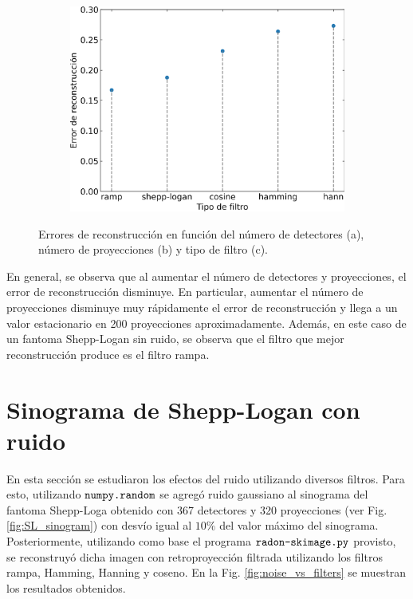\documentclass[letterpaper,12pt]{article}
\theoremstyle{plain}
\begin{document}
\begin{figure}[H]
\begin{subfigure}[h]{0.32\linewidth}
           \caption{}
           \label{fig:err_proy}
        \end{subfigure}
        \begin{subfigure}[h]{0.32\linewidth}
         \centering
         \includegraphics[width=\textwidth]{Figuras/error_vs_filters.png}
         \caption{}
         \label{fig:err_filtro}
      \end{subfigure}
   \caption{Errores de reconstrucción en función del número de detectores (a), número de proyecciones (b) y tipo de filtro (c).}
   \label{fig:err_vs_param}
\end{figure}

En general, se observa que al aumentar el número de detectores y proyecciones, el error de reconstrucción disminuye. En particular, aumentar el número de proyecciones disminuye muy rápidamente el error de reconstrucción y llega a un valor estacionario en 200 proyecciones aproximadamente. Además, en este caso de un fantoma Shepp-Logan sin ruido, se observa que el filtro que mejor reconstrucción produce es el filtro rampa. 

\section{Sinograma de Shepp-Logan con ruido}

En esta sección se estudiaron los efectos del ruido utilizando diversos filtros. Para esto, utilizando $\verb|numpy.random|$ se agregó ruido gaussiano al sinograma del fantoma Shepp-Loga obtenido con 367 detectores y 320 proyecciones (ver Fig. \ref{fig:SL_sinogram}) con desvío igual al $10\%$ del valor máximo del sinograma. Posteriormente, utilizando como base el programa $\verb|radon-skimage.py|$ provisto, se reconstruyó dicha imagen con retroproyección filtrada utilizando los filtros rampa, Hamming, Hanning y coseno. En la Fig. \ref{fig:noise_vs_filters} se muestran los resultados obtenidos. 
\end{document}
